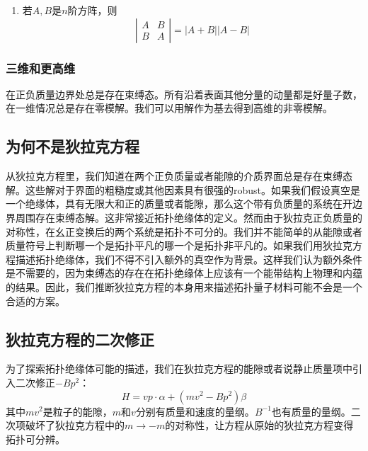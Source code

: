 \documentclass{article}
\numberwithin{equation}{subsection}
\begin{document}
\begin{enumerate}
\begin{equation}
\begin{split}
\begin{array}{ll}
                        A & B \\
                        C & D
                        \end{array}\right|=|D A-B C|,(AB=BA)
    \end{split}
    \end{equation}
    \item 若$A,B$是$n$阶方阵，则
    \begin{equation}
        \left|\begin{array}{ll}
            A & B \\
            B & A
            \end{array}\right|=|A+B||A-B|
    \end{equation}
\end{enumerate}
\subsubsection{三维和更高维}
在正负质量边界处总是存在束缚态。所有沿着表面其他分量的动量都是好量子数，在一维情况总是存在零模解。我们可以用解作为基去得到高维的非零模解。
\subsection{为何不是狄拉克方程}
从狄拉克方程里，我们知道在两个正负质量或者能隙的介质界面总是存在束缚态解。这些解对于界面的粗糙度或其他因素具有很强的robust。如果我们假设真空是一个绝缘体，具有无限大和正的质量或者能隙，那么这个带有负质量的系统在开边界周围存在束缚态解。这非常接近拓扑绝缘体的定义。然而由于狄拉克正负质量的对称性，在幺正变换后的两个系统是拓扑不可分的。我们并不能简单的从能隙或者质量符号上判断哪一个是拓扑平凡的哪一个是拓扑非平凡的。如果我们用狄拉克方程描述拓扑绝缘体，我们不得不引入额外的真空作为背景。这样我们认为额外条件是不需要的，因为束缚态的存在在拓扑绝缘体上应该有一个能带结构上物理和内蕴的结果。因此，我们推断狄拉克方程的本身用来描述拓扑量子材料可能不会是一个合适的方案。
\subsection{狄拉克方程的二次修正}
为了探索拓扑绝缘体可能的描述，我们在狄拉克方程的能隙或者说静止质量项中引入二次修正$-Bp^2$：
\begin{equation}
    H=vp\cdot\alpha+(mv^2-Bp^2)\beta
\end{equation}
其中$mv^2$是粒子的能隙，$m$和$v$分别有质量和速度的量纲。$B^{-1}$也有质量的量纲。二次项破坏了狄拉克方程中的$m\to-m$的对称性，让方程从原始的狄拉克方程变得拓扑可分辨。
\end{document}
